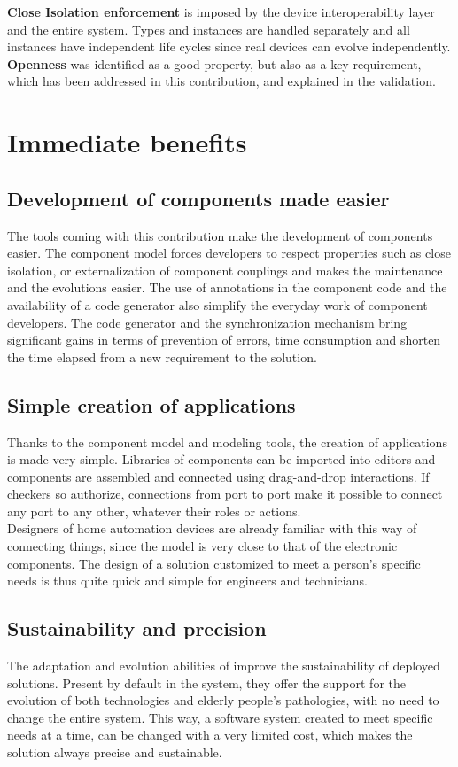 {\bf Close Isolation enforcement} is imposed by the device interoperability layer and the entire \enti{} system. Types and instances are handled separately and all instances have independent life cycles since real devices can evolve independently.\\

{\bf Openness} was identified as a good property, but also as a key requirement, which has been addressed in this contribution, and explained in the validation.


\section{Immediate benefits}

\subsection{Development of components made easier}
The tools coming with this contribution make the development of components easier. The component model forces developers to respect properties such as close isolation, or externalization of component couplings and makes the maintenance and the evolutions easier. The use of annotations in the component code and the availability of a code generator also simplify the everyday work of component developers. The code generator and the synchronization mechanism bring significant gains in terms of prevention of errors, time consumption and shorten the time elapsed from a new requirement to the solution.

\subsection{Simple creation of applications}
Thanks to the component model and modeling tools, the creation of applications is made very simple. Libraries of components can be imported into editors and components are assembled and connected using drag-and-drop interactions. If checkers so authorize, connections from port to port make it possible to connect any port to any other, whatever their roles or actions.\\
Designers of home automation devices are already familiar with this way of connecting things, since the model is very close to that of the electronic components. The design of a solution customized to meet a person's specific needs is thus quite quick and simple for engineers and technicians.

\subsection{Sustainability and precision}
The adaptation and evolution abilities of \enti{} improve the sustainability of deployed solutions. Present by default in the system, they offer the support for the evolution of both technologies and elderly people's pathologies, with no need to change the entire system. This way, a software system created to meet specific needs at a time, can be changed with a very limited cost, which makes the solution always precise and sustainable.

